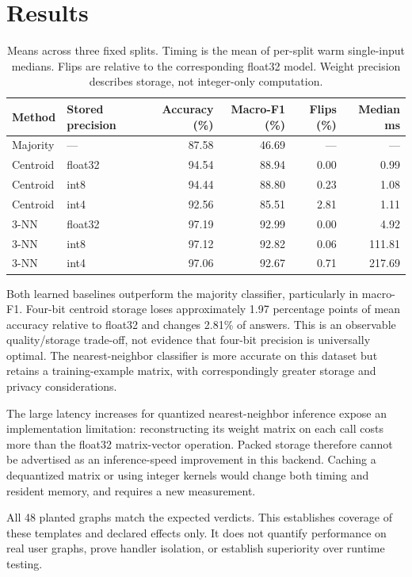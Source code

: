 \documentclass[11pt,a4paper]{article}
\begin{document}
\section{Results}
\begin{table}[ht]
\centering\small
\begin{tabular}{llrrrr}
\toprule
Method & Stored precision & Accuracy (\%) & Macro-F1 (\%) & Flips (\%) & Median ms \\
\midrule
Majority & --- & 87.58 & 46.69 & --- & --- \\
Centroid & float32 & 94.54 & 88.94 & 0.00 & 0.99 \\
Centroid & int8 & 94.44 & 88.80 & 0.23 & 1.08 \\
Centroid & int4 & 92.56 & 85.51 & 2.81 & 1.11 \\
3-NN & float32 & 97.19 & 92.99 & 0.00 & 4.92 \\
3-NN & int8 & 97.12 & 92.82 & 0.06 & 111.81 \\
3-NN & int4 & 97.06 & 92.67 & 0.71 & 217.69 \\
\bottomrule
\end{tabular}
\caption{Means across three fixed splits. Timing is the mean of per-split warm
single-input medians. Flips are relative to the corresponding float32 model.
Weight precision describes storage, not integer-only computation.}
\label{tab:results}
\end{table}

Both learned baselines outperform the majority classifier, particularly in
macro-F1. Four-bit centroid storage loses approximately 1.97 percentage points
of mean accuracy relative to float32 and changes 2.81\% of answers. This is an
observable quality/storage trade-off, not evidence that four-bit precision is
universally optimal. The nearest-neighbor classifier is more accurate on this
dataset but retains a training-example matrix, with correspondingly greater
storage and privacy considerations.

The large latency increases for quantized nearest-neighbor inference expose an
implementation limitation: reconstructing its weight matrix on each call costs
more than the float32 matrix-vector operation. Packed storage therefore cannot
be advertised as an inference-speed improvement in this backend. Caching a
dequantized matrix or using integer kernels would change both timing and resident
memory, and requires a new measurement.

All 48 planted graphs match the expected verdicts. This establishes coverage
of these templates and declared effects only. It does not quantify performance
on real user graphs, prove handler isolation, or establish superiority over
runtime testing.
\end{document}
